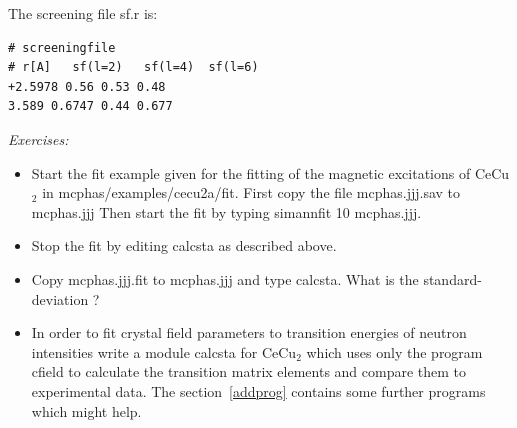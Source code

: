 The screening file {\prg sf.r} is:

\begin{verbatim}
# screeningfile 
# r[A]   sf(l=2)   sf(l=4)  sf(l=6)
+2.5978 0.56 0.53 0.48 
3.589 0.6747 0.44 0.677
\end{verbatim}







\vspace{1cm}
{\em Exercises:}
\begin{itemize}
\item 
Start the fit example given for the fitting of the magnetic 
excitations of CeCu$_2$ in {\prg mcphas/examples/cecu2a/fit}.
First copy the file {\prg mcphas.jjj.sav} to {\prg mcphas.jjj}
Then start the fit by typing {\prg simannfit 10 mcphas.jjj}.
\item
Stop the fit by editing {\prg calcsta} as described above.
\item 
Copy {\prg mcphas.jjj.fit} to {\prg mcphas.jjj}  and type
{\prg calcsta}. What is the standard-deviation ? 
\item 
In order to fit  crystal field parameters to transition
energies of neutron intensities write a module
{\prg calcsta} for CeCu$_2$ which uses only the program
cfield to calculate the transition matrix elements
and compare them to experimental data.
The section~\ref{addprog} contains some further programs which
might help. 
\end{itemize}
